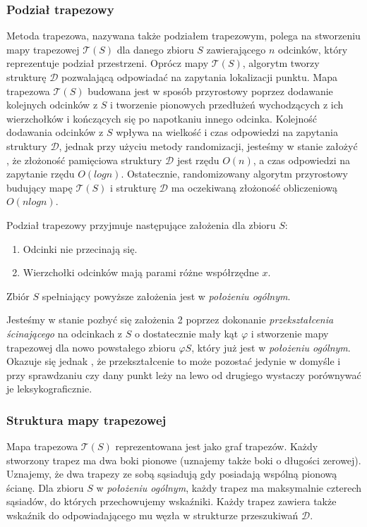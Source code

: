 \documentclass[11pt,a4paper]{article}
\begin{document}
\subsubsection{Podział trapezowy}
Metoda trapezowa, nazywana także podziałem trapezowym,
polega na stworzeniu mapy trapezowej $\mathscr{T}(S)$
dla danego zbioru $S$ zawierającego $n$ odcinków, który
reprezentuje podział przestrzeni. Oprócz mapy $\mathscr{T}(S)$,
algorytm tworzy strukturę $\mathscr{D}$ pozwalającą odpowiadać
na zapytania lokalizacji punktu. Mapa trapezowa $\mathscr{T}(S)$
budowana jest w sposób przyrostowy poprzez dodawanie
kolejnych odcinków z $S$ i tworzenie pionowych przedłużeń wychodzących 
z ich wierzchołków i kończących się po napotkaniu innego odcinka.
Kolejność dodawania odcinków z $S$ wpływa na wielkość 
i czas odpowiedzi na zapytania struktury $\mathscr{D}$, 
jednak przy użyciu metody randomizacji, jesteśmy w stanie 
założyć \cite[s. 133-136]{compgeo}, że złożoność pamięciowa 
struktury $\mathscr{D}$ jest rzędu $O(n)$, a czas odpowiedzi 
na zapytanie rzędu $O(logn)$.
Ostatecznie, randomizowany algorytm przyrostowy budujący mapę
$\mathscr{T}(S)$ i strukturę $\mathscr{D}$ ma oczekiwaną 
złożoność obliczeniową $O(nlogn)$.

Podział trapezowy przyjmuje następujące założenia dla
zbioru $S$:
\begin{enumerate}
    \item Odcinki nie przecinają się.
    \item Wierzchołki odcinków mają parami różne współrzędne $x$.
\end{enumerate}

Zbiór $S$ spełniający powyższe założenia jest w \textit{położeniu ogólnym}.

Jesteśmy w stanie pozbyć się założenia 2 poprzez dokonanie
\textit{przekształcenia ścinającego} na odcinkach z $S$
o dostatecznie mały kąt $\varphi$ i stworzenie mapy trapezowej
dla nowo powstałego zbioru $\varphi S$, który już jest 
w \textit{położeniu ogólnym}.
Okazuje się jednak \cite[s. 137-139]{compgeo},
że przekształcenie to może pozostać jedynie w domyśle i
przy sprawdzaniu czy dany punkt leży na lewo od drugiego
wystaczy porównywać je leksykograficznie.

\subsubsection{Struktura mapy trapezowej}
Mapa trapezowa $\mathscr{T}(S)$ reprezentowana 
jest jako graf trapezów. Każdy stworzony trapez 
ma dwa boki pionowe (uznajemy także boki o długości zerowej).
Uznajemy, że dwa trapezy ze sobą sąsiadują gdy 
posiadają wspólną pionową ścianę. Dla zbioru
$S$ w \textit{położeniu ogólnym}, każdy trapez
ma maksymalnie czterech sąsiadów, do których
przechowujemy wskaźniki. Każdy trapez zawiera
także wskaźnik do odpowiadającego mu węzła
w strukturze przeszukiwań $\mathscr{D}$.
\end{document}

